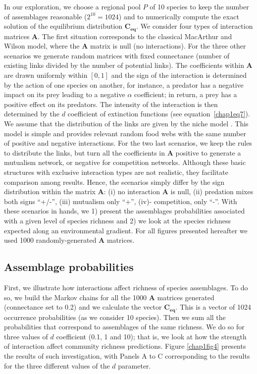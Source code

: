 In our exploration, we choose a regional pool $P$ of 10 species to keep the number of assemblages reasonable ($2^{10}=1024$) and to numerically compute the exact solution of the equilibrium distribution $\mathbf{C_{eq}}$. We consider four types of interaction matrices $\mathbf{A}$. The first situation corresponds to the classical MacArthur and Wilson model, where the $\mathbf{A}$ matrix is null (no interactions). For the three other scenarios we generate random matrices with fixed connectance (number of existing links divided by the number of potential links). The coefficients within $\mathbf{A}$ are drawn uniformly within $[0,1]$ and the sign of the interaction is determined by the action of one species on another, for instance, a predator has a negative impact on its prey leading to a negative $\alpha$ coefficient; in return, a prey has a positive effect on its predators. The intensity of the interaction is then determined by the $d$ coefficient of extinction functions (see equation~\eqref{chap1eq7}). We assume that the distribution of the links are given by the niche model \citep{Williams2000}. This model is simple and provides relevant random food webs with the same number of positive and negative interactions. For the two last scenarios, we keep the rules to distribute the links, but turn all the coefficients in $\mathbf{A}$ positive to generate a mutualism network, or negative for competition networks. Although these basic structures with exclusive interaction types are not realistic, they facilitate comparison among results. Hence, the scenarios simply differ by the sign distribution within the matrix $\mathbf{A}$:
(i) no interaction $\mathbf{A}$ is null, (ii) predation mixes both signs ``+/-'', (iii) mutualism only ``+'', (iv)- competition, only ``-''. With these scenarios in hands, we 1) present the assemblages probabilities associated with a given level of species richness and 2) we look at the species richness expected along an environmental gradient. For all figures presented hereafter we used 1000 randomly-generated $\mathbf{A}$ matrices.

\subsection*{Assemblage probabilities}

First, we illustrate how interactions affect richness of species assemblages. To do so, we build the Markov chains for all the 1000 $\mathbf{A}$ matrices generated (connectance set to 0.2) and we calculate the vector $\mathbf{C_{eq}}$. This is a vector of 1024 occurrence probabilities (as we consider 10 species). Then we sum all the probabilities that correspond to assemblages of the same richness. We do so for three values of $d$ coefficient (0.1, 1 and 10); that is, we look at how the strength of interaction affect community richness predictions. Figure \ref{chap1fig4} presents the results of such investigation, with Panels A to C corresponding to the results for the three different values of the $d$ parameter.

